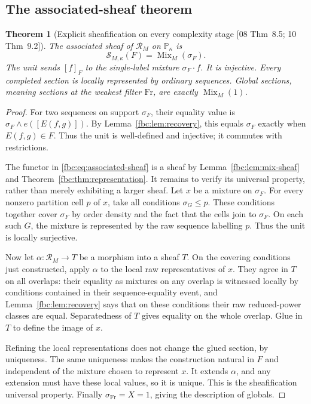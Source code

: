 \documentclass[11pt,letterpaper]{article}
\newtheorem{theorem}{Theorem}[section]
\theoremstyle{definition}
\theoremstyle{remark}
\newcommand{\Fr}{\mathrm{Fr}}
\newcommand{\PP}{\mathbb P}
\newcommand{\Mix}{\operatorname{Mix}}
\newcommand{\R}{\mathscr R}
\newcommand{\Ssh}{\mathscr S}
\newcommand{\eqset}[2]{E(#1,#2)}
\newcommand{\src}[1]{\textup{[#1]}}
\begin{document}
\subsection{The associated-sheaf theorem}
\begin{theorem}[Explicit sheafification on every complexity stage \src{08 Thm~8.5; 10 Thm~9.2}]
\label{fbc:thm:mix-sheafification}
The associated sheaf of $\R_M$ on $\PP_\kappa$ is
\begin{equation}\label{fbc:eq:associated-sheaf}
 \Ssh_{M,\kappa}(F)=\Mix_M(\sigma_F).
\end{equation}
The unit sends $[f]_F$ to the single-label mixture
$\sigma_F\cdot f$. It is injective. Every completed section is locally
represented by ordinary sequences. Global sections, meaning
sections at the weakest filter $\Fr$, are exactly $\Mix_M(1)$.
\end{theorem}
\begin{proof}
For two sequences on support $\sigma_F$, their equality value is
$\sigma_F\wedge e([\eqset{f}{g}])$. By
Lemma~\ref{fbc:lem:recovery}, this equals $\sigma_F$ exactly when
$\eqset{f}{g}\in F$. Thus the unit is well-defined and injective;
it commutes with restrictions.

The functor in \eqref{fbc:eq:associated-sheaf} is a sheaf by
Lemma~\ref{fbc:lem:mix-sheaf} and Theorem~\ref{fbc:thm:representation}.
It remains to verify its universal property, rather than merely
exhibiting a larger sheaf. Let $x$ be a mixture on $\sigma_F$.
For every nonzero partition cell $p$ of $x$, take all conditions
$\sigma_G\leq p$. These conditions together cover $\sigma_F$
by order density and the fact that the cells join to $\sigma_F$.
On each such $G$, the mixture is represented by the raw sequence
labelling $p$. Thus the unit is locally surjective.

Now let $\alpha:\R_M\to T$ be a morphism into a sheaf $T$.
On the covering conditions just constructed, apply $\alpha$ to
the local raw representatives of $x$. They agree in $T$ on all
overlaps: their equality as mixtures on any overlap is witnessed
locally by conditions contained in their sequence-equality event,
and Lemma~\ref{fbc:lem:recovery} says that on these conditions their
raw reduced-power classes are equal. Separatedness of $T$ gives
equality on the whole overlap. Glue in $T$ to define the image of
$x$.

Refining the local representations does not change the glued
section, by uniqueness. The same uniqueness makes the construction
natural in $F$ and independent of the mixture chosen to represent
$x$. It extends $\alpha$, and any extension must have these local
values, so it is unique. This is the sheafification universal property.
Finally $\sigma_{\Fr}=X=1$, giving the description of globals.
\end{proof}
\end{document}
